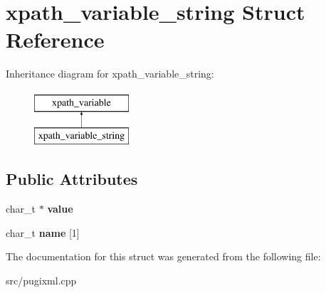\hypertarget{structxpath__variable__string}{}\section{xpath\+\_\+variable\+\_\+string Struct Reference}
\label{structxpath__variable__string}
Inheritance diagram for xpath\+\_\+variable\+\_\+string\+:\begin{figure}[H]
\begin{center}
\leavevmode
\includegraphics[height=2.000000cm]{structxpath__variable__string}
\end{center}
\end{figure}
\subsection*{Public Attributes}
\begin{DoxyCompactItemize}
\item 
\mbox{\label{structxpath__variable__string_aeb8a87a8457d2615cd7b766fd3f30559}} 
char\+\_\+t $\ast$ {\bfseries value}
\item 
\mbox{\label{structxpath__variable__string_a5c43cdcc55a620db0e7bdd29b4d56e89}} 
char\+\_\+t {\bfseries name} \mbox{[}1\mbox{]}
\end{DoxyCompactItemize}


The documentation for this struct was generated from the following file\+:\begin{DoxyCompactItemize}
\item 
src/pugixml.\+cpp\end{DoxyCompactItemize}
